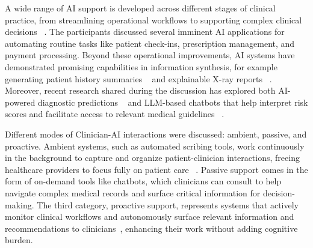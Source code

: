 A wide range of AI support is developed across different stages of clinical practice, from streamlining operational workflows to supporting complex clinical decisions ~\citep{10.1145/3582430}. 
The participants discussed several imminent AI applications for automating routine tasks like patient check-ins, prescription management, and payment processing. 
Beyond these operational improvements, AI systems have demonstrated promising capabilities in information synthesis, for example generating patient history summaries ~\citep{keszthelyi2023patient} and explainable X-ray reports ~\citep{DEPERLIOGLU2022152}. 
Moreover, recent research shared during the discussion has explored both AI-powered diagnostic predictions ~\citep{10.1001/jama.2023.22295} and LLM-based chatbots that help interpret risk scores and facilitate access to relevant medical guidelines ~\citep{chan2023assessingusabilitygutgptsimulation, 10.1145/3613904.3642024}.

Different modes of Clinician-AI interactions were discussed: ambient, passive, and proactive. Ambient systems, such as automated scribing tools, work continuously in the background to capture and organize patient-clinician interactions, freeing healthcare providers to focus fully on patient care ~\citep{doi:10.1056/CAT.23.0404}. Passive support comes in the form of on-demand tools like chatbots, which clinicians can consult to help navigate complex medical records and surface critical information for decision-making. The third category, proactive support, represents systems that actively monitor clinical workflows and autonomously surface relevant information and recommendations to clinicians~\citep{jiang2023conceptualizing}, enhancing their work without adding cognitive burden.



